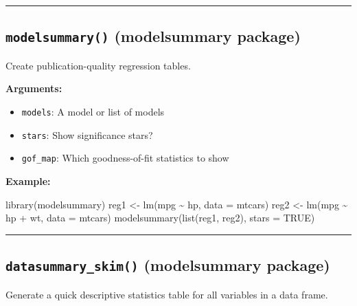 \documentclass[
  letterpaper,
  DIV=11,
  numbers=noendperiod]{scrreprt}
\newenvironment{Shaded}{\begin{snugshade}}{\end{snugshade}}
\newcommand{\AttributeTok}[1]{\textcolor[rgb]{0.40,0.45,0.13}{#1}}
\newcommand{\ConstantTok}[1]{\textcolor[rgb]{0.56,0.35,0.01}{#1}}
\newcommand{\FunctionTok}[1]{\textcolor[rgb]{0.28,0.35,0.67}{#1}}
\newcommand{\NormalTok}[1]{\textcolor[rgb]{0.00,0.23,0.31}{#1}}
\newcommand{\OtherTok}[1]{\textcolor[rgb]{0.00,0.23,0.31}{#1}}
\newcommand{\SpecialCharTok}[1]{\textcolor[rgb]{0.37,0.37,0.37}{#1}}
\providecommand{\tightlist}{%
  \setlength{\itemsep}{0pt}\setlength{\parskip}{0pt}}
\begin{document}
\begin{center}\rule{0.5\linewidth}{0.5pt}\end{center}

\subsection{\texorpdfstring{\texttt{modelsummary()} (modelsummary
package)}{modelsummary() (modelsummary package)}}\label{modelsummary-modelsummary-package}

Create publication-quality regression tables.

\textbf{Arguments:}

\begin{itemize}
\tightlist
\item
  \texttt{models}: A model or list of models
\item
  \texttt{stars}: Show significance stars?
\item
  \texttt{gof\_map}: Which goodness-of-fit statistics to show
\end{itemize}

\textbf{Example:}

\begin{Shaded}
\begin{Highlighting}[]
\FunctionTok{library}\NormalTok{(modelsummary)}
\NormalTok{reg1 }\OtherTok{\textless{}{-}} \FunctionTok{lm}\NormalTok{(mpg }\SpecialCharTok{\textasciitilde{}}\NormalTok{ hp, }\AttributeTok{data =}\NormalTok{ mtcars)}
\NormalTok{reg2 }\OtherTok{\textless{}{-}} \FunctionTok{lm}\NormalTok{(mpg }\SpecialCharTok{\textasciitilde{}}\NormalTok{ hp }\SpecialCharTok{+}\NormalTok{ wt, }\AttributeTok{data =}\NormalTok{ mtcars)}
\FunctionTok{modelsummary}\NormalTok{(}\FunctionTok{list}\NormalTok{(reg1, reg2), }\AttributeTok{stars =} \ConstantTok{TRUE}\NormalTok{)}
\end{Highlighting}
\end{Shaded}

\begin{center}\rule{0.5\linewidth}{0.5pt}\end{center}

\subsection{\texorpdfstring{\texttt{datasummary\_skim()} (modelsummary
package)}{datasummary\_skim() (modelsummary package)}}\label{datasummary_skim-modelsummary-package}

Generate a quick descriptive statistics table for all variables in a
data frame.
\end{document}
